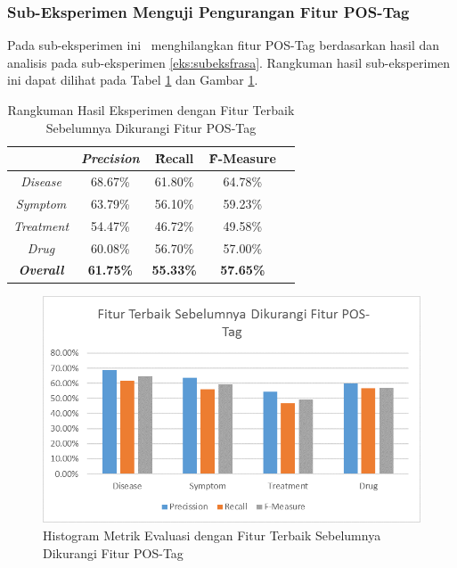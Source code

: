 	\subsubsection{Sub-Eksperimen Menguji Pengurangan Fitur POS-Tag}\label{eks:subeksminpostag}
	Pada sub-eksperimen ini \saya~menghilangkan fitur POS-Tag berdasarkan hasil dan analisis pada sub-eksperimen \ref{eks:subeksfrasa}. Rangkuman hasil sub-eksperimen ini dapat dilihat pada Tabel \ref{table:owndict6} dan Gambar \ref{fig:owndict6}.
	
	\begin{table}
		\centering
		\caption{Rangkuman Hasil Eksperimen dengan Fitur Terbaik Sebelumnya Dikurangi Fitur POS-Tag}
		\begin{tabular}{|c|c|c|c|c|}
			\hline
			                      & \textit{Precision} & \f{\f{Recall}} & \f{\f{F-Measure}} \\ \hline
			\textit{Disease}      & 68.67\%             & 61.80\%        & 64.78\%           \\ \hline
			\textit{Symptom}      & 63.79\%             & 56.10\%        & 59.23\%           \\ \hline
			\textit{Treatment}    & 54.47\%             & 46.72\%        & 49.58\%           \\ \hline
			\textit{Drug}		  & 60.08\%             & 56.70\%        & 57.00\%           \\ \hline
			\textit{\textbf{Overall}}&\textbf{61.75\%}  & \textbf{55.33\%}& \textbf{57.65\%} \\ \hline
		\end{tabular}
		\label{table:owndict6}
	\end{table}
	
	\begin{figure}
		\centering
		\includegraphics[width=0.85\linewidth]{images/histogram6}
		\caption{Histogram Metrik Evaluasi dengan Fitur Terbaik Sebelumnya Dikurangi Fitur POS-Tag}
		\label{fig:owndict6}
	\end{figure}
	
